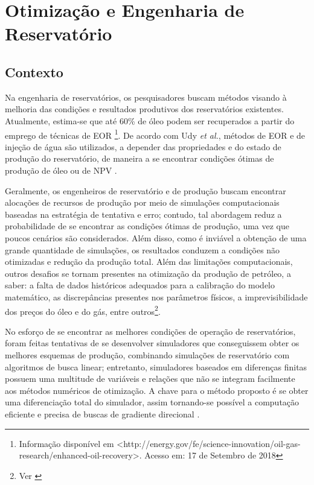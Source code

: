 \section{Otimiza\c{c}\~{a}o e Engenharia de Reservat\'{o}rio}
\subsection{Contexto}
Na engenharia de reservat\'{o}rios, os pesquisadores buscam m\'{e}todos visando \`{a} melhoria das condi\c{c}\~{o}es e resultados produtivos dos reservat\'{o}rios existentes. Atualmente, estima-se que at\'{e} 60\% de \'{o}leo podem ser recuperados a partir do emprego de t\'{e}cnicas de EOR \footnote{Informa\c{c}\~{a}o dispon\'{i}vel em <http://energy.gov/fe/science-innovation/oil-gas-research/enhanced-oil-recovery>. Acesso em: 17 de Setembro de 2018}. De acordo com Udy \textit{et al.}, m\'{e}todos de EOR e de inje\c{c}\~{a}o de \'{a}gua s\~{a}o utilizados, a depender das propriedades e do estado de produ\c{c}\~{a}o do reservat\'{o}rio, de maneira a se encontrar condi\c{c}\~{o}es \'{o}timas de produ\c{c}\~{a}o de \'{o}leo ou de NPV \cite{udyEOR}.

Geralmente, os engenheiros de reservat\'{o}rio e de produ\c{c}\~{a}o buscam encontrar aloca\c{c}\~{o}es de recursos de produ\c{c}\~{a}o por meio de simula\c{c}\~{o}es computacionais baseadas na estrat\'{e}gia de tentativa e erro; contudo, tal abordagem reduz a probabilidade de se encontrar as condi\c{c}\~{o}es \'{o}timas de produ\c{c}\~{a}o, uma vez que poucos cen\'{a}rios s\~{a}o considerados. Al\'{e}m disso, como \'{e} invi\'{a}vel a obten\c{c}\~{a}o de uma grande quantidade de simula\c{c}\~{o}es, os resultados conduzem a condi\c{c}\~{o}es n\~{a}o otimizadas e redu\c{c}\~{a}o da produ\c{c}\~{a}o total. Al\'{e}m das limita\c{c}\~{o}es computacionais, outros desafios se tornam presentes na otimiza\c{c}\~{a}o da produ\c{c}\~{a}o de petr\'{o}leo, a saber: a falta de dados hist\'{o}ricos adequados para a calibra\c{c}\~{a}o do modelo matem\'{a}tico, as discrep\^{a}ncias presentes nos par\^{a}metros f\'{i}sicos, a imprevisibilidade dos pre\c{c}os do \'{o}leo e do g\'{a}s, entre outros\footnote{Ver \cite{udyEOR}}.

No esfor\c{c}o de se encontrar as melhores condi\c{c}\~{o}es de opera\c{c}\~{a}o de reservat\'{o}rios, foram feitas tentativas de se desenvolver simuladores que conseguissem obter os melhores esquemas de produ\c{c}\~{a}o, combinando simula\c{c}\~{o}es de reservat\'{o}rio com algoritmos de busca linear; entretanto, simuladores baseados em diferen\c{c}as finitas possuem uma multitude de vari\'{a}veis e rela\c{c}\~{o}es que n\~{a}o se integram facilmente aos m\'{e}todos num\'{e}ricos de otimiza\c{c}\~{a}o. A chave para o m\'{e}todo proposto \'{e} se obter uma diferencia\c{c}\~{a}o total do simulador, assim tornando-se poss\'{i}vel a computa\c{c}\~{a}o eficiente e precisa de buscas de gradiente direcional \cite{asheim88}. 

